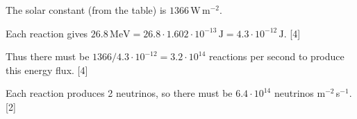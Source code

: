 The solar constant (from the table) is $1366$\,W\,m$^{-2}$.

Each reaction gives
$26.8\,\mathrm{MeV} = 26.8 \cdot 1.602 \cdot 10^{-13}\,\mathrm{J}
= 4.3 \cdot 10^{-12}\,\mathrm{J}$. \hfill[4]

Thus there must be $1366 / 4.3 \cdot 10^{-12} = 3.2 \cdot 10^{14}$ reactions per
second to produce this energy flux. \hfill[4]

Each reaction produces 2 neutrinos, so there must be
$6.4 \cdot 10^{14}$ neutrinos m$^{-2}\,$s$^{-1}$. \hfill[2]
